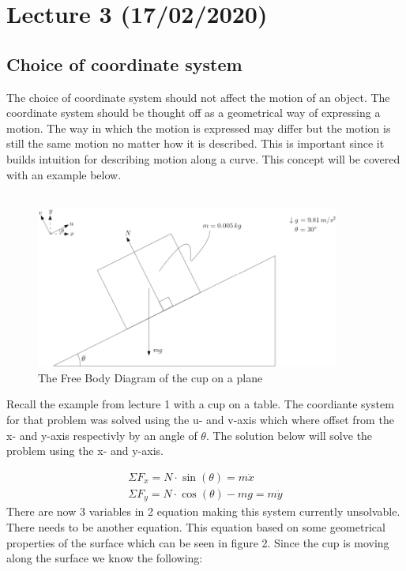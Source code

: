 \documentclass[11pt, a4paper]{article}
\begin{document}
\setcounter{section}{2}
\section{Lecture 3 (17/02/2020)}
\subsection{Choice of coordinate system}
The choice of coordinate system should not affect the motion of an object. The coordinate system should be thought
off as a geometrical way of expressing a motion. The way in which the motion is expressed may differ but the motion
is still the same motion no matter how it is described. This is important since it builds intuition for describing
motion along a curve. This concept will be covered with an example below.\\
\\
\begin{figure}[h]
    \centerline{\includegraphics[width=10cm]{images/Crate_No_Friction.png}}
    \caption{The Free Body Diagram of the cup on a plane}
\end{figure}

Recall the example from lecture 1 with a cup on a table. The coordiante system for that problem was solved using 
the u- and v-axis which where offset from the x- and y-axis respectivly by an angle of $\theta$. The solution below
will solve the problem using the x- and y-axis.

\begin{gather}
    \Sigma F_x = N \cdot \sin(\theta) = m\ddot{x} \\
    \Sigma F_y = N \cdot \cos(\theta) - mg = m\ddot{y}
\end{gather}
There are now 3 variables in 2 equation making this system currently unsolvable. There needs to be another equation.
This equation based on some geometrical properties of the surface which can be seen in figure 2. 
Since the cup is moving along the surface we know the following:
\end{document}
